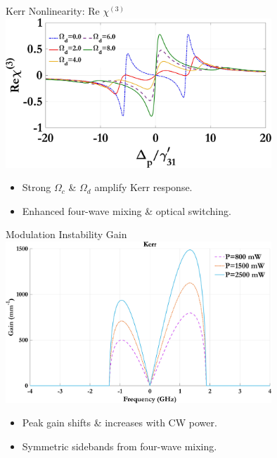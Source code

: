\documentclass{beamer}
\begin{document}
\begin{frame}{Kerr Nonlinearity: Re $\chi^{(3)}$}
  \vspace{-17pt}
  \hspace*{27pt}
  \includegraphics[width=0.75\textwidth]{Assets/Real_chi3_Omega_d.jpeg}
  \begin{itemize}
    \item Strong $\Omega_c$ \& $\Omega_d$ amplify Kerr response.
    \item Enhanced four-wave mixing \& optical switching.
  \end{itemize}
\end{frame}

\begin{frame}{Modulation Instability Gain}
  \hspace*{30pt}
  \includegraphics[width=0.75\textwidth]{Assets/G_v_Power.jpeg}
  \begin{itemize}
    \item Peak gain shifts \& increases with CW power.
    \item Symmetric sidebands from four-wave mixing.
  \end{itemize}
\end{frame}
\end{document}
